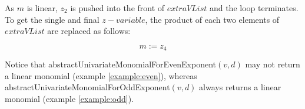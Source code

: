 \begin{sloppypar}
\begin{example}
    As $m$ is linear, $z_{2}$ is pushed into the front of $extraVList$ and the loop terminates.
    To get the single and final $z-variable$, the product of each two elements of $extraVList$ are replaced as follows:
    
\tikzset{every picture/.style=remember picture}
\begin{figure}[H]
\centering
{}
\end{figure}
    
    $$m := z_{4}$$
\end{example}
\end{sloppypar}

\begin{sloppypar}
\noindent Notice that abstractUnivariateMonomialForEvenExponent$(v, d)$ may not return a linear monomial (example \ref{example:even}), whereas abstractUnivariateMonomialForOddExponent$(v, d)$ always returns a linear monomial (example \ref{example:odd}).\newline
\end{sloppypar}

